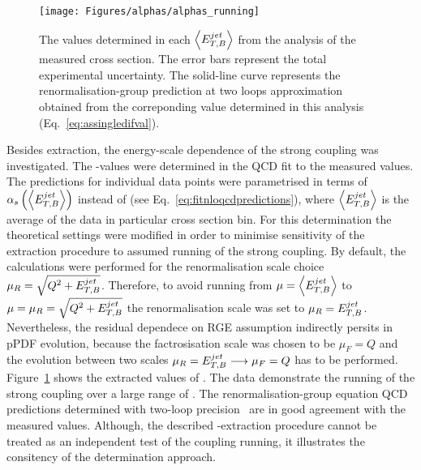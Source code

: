 \begin{figure}[t!]
 \centering
 \texttt{[image: Figures/alphas/alphas\_running]}
 \caption{The \as values determined in each $\left<\mbox{$E_{T,B}^{jet}$}\right>$ from the analysis of the measured \dsdetjetb cross section. The error bars represent the total experimental uncertainty. The solid-line curve represents the renormalisation-group prediction at two loops approximation obtained from the correponding \asz value determined in this analysis (Eq.~\eqref{eq:assingledifval}).}
 \label{fig:asrunning}
\end{figure}
Besides \asz extraction, the energy-scale dependence of the strong coupling was investigated. The \as-values were determined in the QCD fit to the measured \dsdetjetb values. The predictions for individual \dsdetjetb data points were parametrised in terms of $\mbox{$\alpha_{s}$}\left(\left<\mbox{$E_{T,B}^{jet}$}\right>\right)$ instead of \asz (see Eq.~\eqref{eq:fitnloqcdpredictions}), where $\left<\mbox{$E_{T,B}^{jet}$}\right>$ is the average \etjetb of the data in particular cross section bin. For this determination the theoretical settings were modified in order to minimise sensitivity of the extraction procedure to assumed running of the strong coupling. By default, the calculations were performed for the renormalisation scale choice $\mu_R=\sqrt{\mbox{${Q^2}$}+\mbox{$E_{T,B}^{jet}$}}$. Therefore, to avoid running from $\mu=\left<\mbox{$E_{T,B}^{jet}$}\right>$ to $\mu=\mu_R=\sqrt{\mbox{${Q^2}$}+\mbox{$E_{T,B}^{jet}$}}$ the renormalisation scale was set to $\mu_R=\mbox{$E_{T,B}^{jet}$}$. Nevertheless, the residual dependece on RGE assumption indirectly persits in pPDF evolution, because the factrosisation scale was chosen to be $\mu_F=Q$ and the evolution between two scales $\mu_R = \mbox{$E_{T,B}^{jet}$} \longrightarrow \mu_F = Q$ has to be performed. Figure~\ref{fig:asrunning} shows the extracted values of \as. The data demonstrate the running of the strong coupling over a large range of \etjetb. The renormalisation-group equation QCD predictions determined with two-loop precision~\cite{Gross:1973id, Politzer:1973fx, Gross:1973ju, Politzer:1974fr} are in good agreement with the measured values. Although, the described \as-extraction procedure cannot be treated as an independent test of the coupling running, it illustrates the consitency of the \as determination approach.


